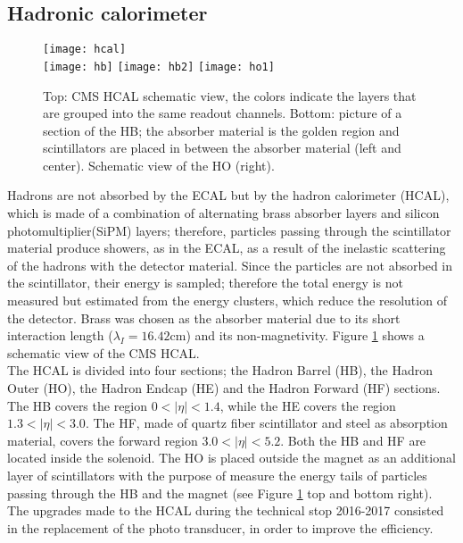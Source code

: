 \subsection{Hadronic calorimeter}

\begin{figure}[h!]
  \centering
  \texttt{[image: hcal]}\\
  \texttt{[image: hb]}
  \texttt{[image: hb2]}
  \texttt{[image: ho1]} 
  \caption[CMS HCAL schematic view]{Top: CMS HCAL schematic view, the colors indicate the layers that are grouped into the same readout channels. Bottom: picture of a section of the HB; the absorber material is the golden region and scintillators are placed in between the absorber material (left and center). Schematic view of the HO (right). \cite{hcal,hb} }
  \label{fig:hcal}
\end{figure}

\noindent Hadrons are not absorbed by the ECAL but by the hadron calorimeter (HCAL), which is made of a combination of alternating brass absorber layers and silicon photomultiplier(SiPM) layers; therefore, particles passing through the scintillator material produce showers, as in the ECAL, as a result of the inelastic scattering of the hadrons with the detector material. Since the particles are not absorbed in the scintillator, their energy is sampled; therefore the total energy is not measured but estimated from the energy clusters, which reduce the resolution of the detector. Brass was chosen as the absorber material due to its short interaction length ($\lambda_I=16.42$cm) and its non-magnetivity. Figure \ref{fig:hcal} shows a schematic view of the CMS HCAL.\\

\noindent The HCAL is divided into four sections; the Hadron Barrel (HB), the Hadron Outer (HO), the Hadron Endcap (HE) and the Hadron Forward (HF) sections. The HB covers the region $0<|\eta|<1.4$, while the HE covers the region $1.3<|\eta|<3.0$. The HF, made of quartz fiber scintillator and steel as absorption material, covers the forward region $3.0<|\eta|<5.2$. Both the HB and HF are located inside the solenoid. The HO is placed outside the magnet as an additional layer of scintillators with the purpose of measure the energy tails of particles passing through the HB and the magnet (see Figure \ref{fig:hcal} top and bottom right). The upgrades made to the HCAL during the technical stop 2016-2017 consisted in the replacement of the photo transducer, in order to improve the efficiency.

